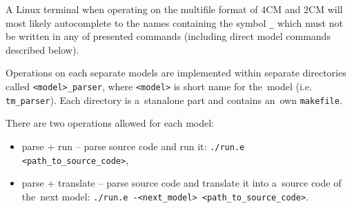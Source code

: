 \documentclass[english,shortabstract,mgr]{iithesis}
\begin{document}
A Linux terminal when operating on the multifile format of $4$CM and $2$CM will
most likely autocomplete to the names containing the symbol \texttt{\_} which must not
be written in any of presented commands (including direct model commands described below).

Operations on each separate models are implemented within separate directories called
\texttt{<model>\_parser}, where \texttt{<model>} is short name for the~model
(i.e. \texttt{tm\_parser}). Each directory is a~stanalone part and contains
an~own \texttt{makefile}.

There are two operations allowed for each model:
\begin{itemize}
  \item parse + run -- parse source code and run it: \texttt{./run.e <path\_to\_source\_code>},
  \item parse + translate -- parse source code and translate it into a~source code
      of the~next model: \texttt{./run.e -<next\_model> <path\_to\_source\_code>}.
\end{itemize}
\end{document}
